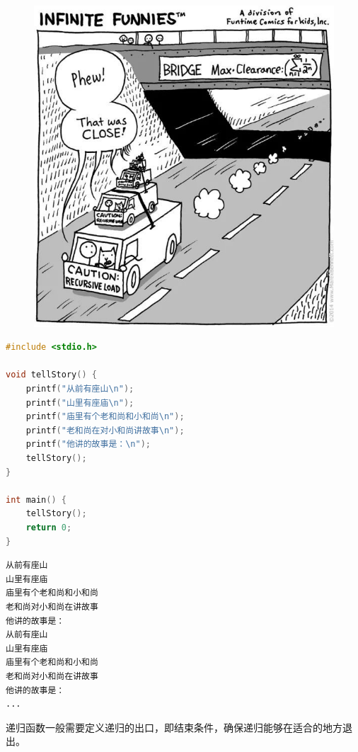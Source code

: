 \begin{figure}[H]
	\centering
	\includegraphics[scale=0.6]{img/C6/6-3/5.png}
\end{figure}


\begin{lstlisting}[language=C]
#include <stdio.h>

void tellStory() {
	printf("从前有座山\n");
	printf("山里有座庙\n");
	printf("庙里有个老和尚和小和尚\n");
	printf("老和尚在对小和尚讲故事\n");
	printf("他讲的故事是：\n");
	tellStory();
}

int main() {
	tellStory();
	return 0;
}
\end{lstlisting}

\begin{tcolorbox}
	\begin{verbatim}
从前有座山
山里有座庙
庙里有个老和尚和小和尚
老和尚对小和尚在讲故事
他讲的故事是：
从前有座山
山里有座庙
庙里有个老和尚和小和尚
老和尚对小和尚在讲故事
他讲的故事是：
...
	\end{verbatim}
\end{tcolorbox}

递归函数一般需要定义递归的出口，即结束条件，确保递归能够在适合的地方退出。\\

